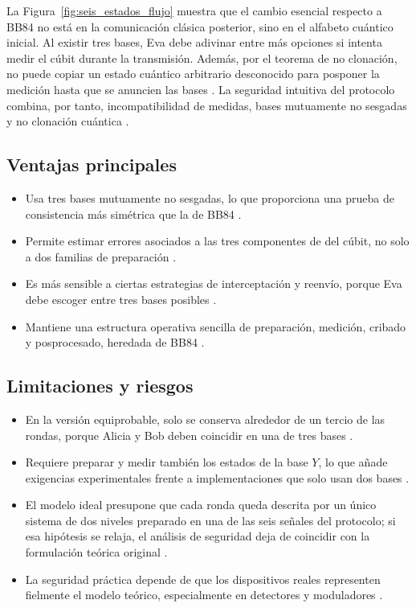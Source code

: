 La Figura~\ref{fig:seis_estados_flujo} muestra que el cambio esencial respecto a BB84 no está en la comunicación clásica posterior, sino en el alfabeto cuántico inicial. Al existir tres bases, Eva debe adivinar entre más opciones si intenta medir el cúbit durante la transmisión. Además, por el teorema de no clonación, no puede copiar un estado cuántico arbitrario desconocido para posponer la medición hasta que se anuncien las bases \citep{wootters1982}. La seguridad intuitiva del protocolo combina, por tanto, incompatibilidad de medidas, bases mutuamente no sesgadas y no clonación cuántica \citep{pauli1927,schwinger1960,wootters1982,bruss1998}.


\subsection{Ventajas principales}
\begin{itemize}
    \item Usa tres bases mutuamente no sesgadas, lo que proporciona una prueba de consistencia más simétrica que la de BB84 \citep{schwinger1960,bruss1998}.
    \item Permite estimar errores asociados a las tres componentes de \cite{pauli1927} del cúbit, no solo a dos familias de preparación \citep{bruss1998}.
    \item Es más sensible a ciertas estrategias de interceptación y reenvío, porque Eva debe escoger entre tres bases posibles \citep{bennett1984,bruss1998}.
    \item Mantiene una estructura operativa sencilla de preparación, medición, cribado y posprocesado, heredada de BB84 \citep{bennett1984}.
\end{itemize}

\subsection{Limitaciones y riesgos}
\begin{itemize}
    \item En la versión equiprobable, solo se conserva alrededor de un tercio de las rondas, porque Alicia y Bob deben coincidir en una de tres bases \citep{bruss1998}.
    \item Requiere preparar y medir también los estados de la base $Y$, lo que añade exigencias experimentales frente a implementaciones que solo usan dos bases \citep{pauli1927,bruss1998}.
    \item El modelo ideal presupone que cada ronda queda descrita por un único sistema de dos niveles preparado en una de las seis señales del protocolo; si esa hipótesis se relaja, el análisis de seguridad deja de coincidir con la formulación teórica original \citep{bennett1984,bruss1998}.
    \item La seguridad práctica depende de que los dispositivos reales representen fielmente el modelo teórico, especialmente en detectores y moduladores \citep{bruss1998,bechmann1999}.
\end{itemize}


